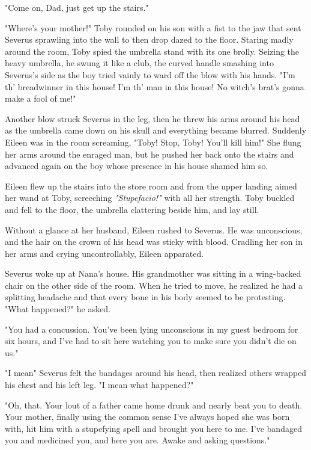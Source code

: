 "Come on, Dad, just get up the stairs."

"Where's your mother!" Toby rounded on his son with a fist to the jaw that sent Severus sprawling into the wall to then drop dazed to the floor. Staring madly around the room, Toby spied the umbrella stand with its one brolly. Seizing the heavy umbrella, he swung it like a club, the curved handle smashing into Severus's side as the boy tried vainly to ward off the blow with his hands. "I'm th' breadwinner in this house! I'm th' man in this house! No witch's brat's gonna make a fool of me!"

Another blow struck Severus in the leg, then he threw his arms around his head as the umbrella came down on his skull and everything became blurred. Suddenly Eileen was in the room screaming, "Toby! Stop, Toby! You'll kill him!" She flung her arms around the enraged man, but he pushed her back onto the stairs and advanced again on the boy whose presence in his house shamed him so.

Eileen flew up the stairs into the store room and from the upper landing aimed her wand at Toby, screeching \emph{"Stupefacio!"} with all her strength. Toby buckled and fell to the floor, the umbrella clattering beside him, and lay still.

Without a glance at her husband, Eileen rushed to Severus. He was unconscious, and the hair on the crown of his head was sticky with blood. Cradling her son in her arms and crying uncontrollably, Eileen apparated.

Severus woke up at Nana's house. His grandmother was sitting in a wing-backed chair on the other side of the room. When he tried to move, he realized he had a splitting headache and that every bone in his body seemed to be protesting. "What happened?" he asked.

"You had a concussion. You've been lying unconscious in my guest bedroom for six hours, and I've had to sit here watching you to make sure you didn't die on us."

"I mean{\el}" Severus felt the bandages around his head, then realized others wrapped his chest and his left leg. "I mean what happened?"

"Oh, that. Your lout of a father came home drunk and nearly beat you to death. Your mother, finally using the common sense I've always hoped she was born with, hit him with a stupefying spell and brought you here to me. I've bandaged you and medicined you, and here you are. Awake and asking questions."

